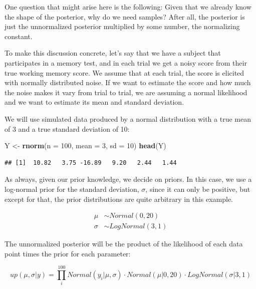 \documentclass[12pt,]{krantz}
\newenvironment{Shaded}{\begin{snugshade}}{\end{snugshade}}
\newcommand{\DataTypeTok}[1]{\textcolor[rgb]{0.13,0.29,0.53}{#1}}
\newcommand{\DecValTok}[1]{\textcolor[rgb]{0.00,0.00,0.81}{#1}}
\newcommand{\KeywordTok}[1]{\textcolor[rgb]{0.13,0.29,0.53}{\textbf{#1}}}
\newcommand{\NormalTok}[1]{#1}
\newcommand{\StringTok}[1]{\textcolor[rgb]{0.31,0.60,0.02}{#1}}
\theoremstyle{definition}
\theoremstyle{definition}
\theoremstyle{definition}
\theoremstyle{remark}
\begin{document}
One question that might arise here is the following: Given that we already know the shape of the posterior, why do we need samples? After all, the posterior is just the unnormalized posterior multiplied by some number, the normalizing constant.

To make this discussion concrete, let's say that we have a subject that participates in a memory test, and in each trial we get a noisy score from their true working memory score. We assume that at each trial, the score is elicited with normally distributed noise. If we want to estimate the score and how much the noise makes it vary from trial to trial, we are assuming a normal likelihood and we want to estimate its mean and standard deviation.

We will use simulated data produced by a normal distribution with a true mean of 3 and a true standard deviation of 10:

\begin{Shaded}
\begin{Highlighting}[]
\NormalTok{Y <-}\StringTok{ }\KeywordTok{rnorm}\NormalTok{(}\DataTypeTok{n =} \DecValTok{100}\NormalTok{, }\DataTypeTok{mean =} \DecValTok{3}\NormalTok{, }\DataTypeTok{sd =} \DecValTok{10}\NormalTok{)}
\KeywordTok{head}\NormalTok{(Y)}
\end{Highlighting}
\end{Shaded}

\begin{verbatim}
## [1]  10.82   3.75 -16.89   9.20   2.44   1.44
\end{verbatim}

As always, given our prior knowledge, we decide on priors. In this case, we use a log-normal prior for the standard deviation, \(\sigma\), since it can only be positive, but except for that, the prior distributions are quite arbitrary in this example.

\begin{equation}
\begin{aligned}
\mu &\sim Normal(0, 20)\\
\sigma &\sim LogNormal(3, 1)
\end{aligned}
\label{eq:priorsdem}
\end{equation}

The unnormalized posterior will be the product of the likelihood of each data point times the prior for each parameter:

\begin{equation}
up(\mu, \sigma |y) = \prod_i^{100} Normal(y_i|\mu, \sigma) \cdot Normal(\mu | 0, 20) \cdot LogNormal(\sigma | 3, 1)
\label{eq:up}
\end{equation}
\end{document}

